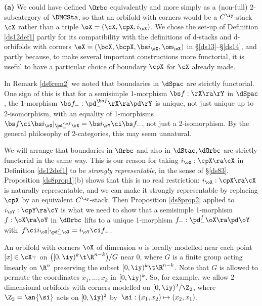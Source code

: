 \documentclass{article}
\begin{document}
\begin{rem}{\bf(a)} We could have defined $\Orbc$ equivalently and
more simply as a (non-full) 2-subcategory of $\DMCSta$, so that an
orbifold with corners would be a $C^\iy$-stack $\cX$ rather than a
triple $\oX=(\cX,\cpX,i_\oX)$. We chose the set-up of Definition
\ref{ds12def1} partly for its compatibility with the definitions of
d-stacks and d-orbifolds with corners $\eX=(\bcX,\bcpX,\bs
i_\eX,\om_\eX)$ in \S\ref{ds13}--\S\ref{ds14}, and partly because,
to make several important constructions more functorial, it is
useful to have a particular choice of boundary $\cpX$ for $\cX$
already made.
\smallskip

 In Remark \ref{ds6rem2} we noted that boundaries
in $\dSpac$ are strictly functorial. One sign of this is that for a
semisimple 1-morphism $\bs f:\rX\ra\rY$ in $\dSpac$, the 1-morphism
$\bs f_-:\pd_-^{\bs f}\rX\ra\pd\rY$ is unique, not just unique up to
2-isomorphism, with an equality of 1-morphisms $\bs f\ci\bs i_\rX
\vert_{\smash{\pd_-^{\bs f}\rX}}=\bs i_\rY\ci\bs f_-$, not just a
2-isomorphism. By the general philosophy of 2-categories, this may
seem unnatural.

We will arrange that boundaries in $\Orbc$ and also in
$\dStac,\dOrbc$ are strictly functorial in the same way. This is our
reason for taking $i_\oX:\cpX\ra\cX$ in Definition \ref{ds12def1} to
be {\it strongly representable},
 in the sense of \S\ref{ds83}.
Proposition \ref{ds8prop1}(b) shows that this is no real
restriction: $i_\oX:\cpX\ra\cX$ is naturally representable, and we
can make it strongly representable by replacing $\cpX$ by an
equivalent $C^\iy$-stack. Then Proposition \ref{ds8prop2} applied to
$i_\oY:\cpY\ra\cY$ is what we need to show that a semisimple
1-morphism $f:\oX\ra\oY$ in $\dOrbc$ lifts to a unique 1-morphism
$f_-:\pd_-^f\oX\ra\pd\oY$ with~$f\ci i_\oX
\vert_{\smash{\pd_-^f\oX}}=i_\oY\ci f_-$.
\smallskip

 An orbifold with corners $\oX$ of dimension $n$ is
locally modelled near each point $[x]\in\cX_\top$ on
$\bigl([0,\iy)^k\t\R^{n-k} \bigr)/G$ near $0$, where $G$ is a finite
group acting linearly on $\R^n$ preserving the subset
$[0,\iy)^k\t\R^{n-k}$. Note that $G$ is allowed to permute the
coordinates $x_1,\ldots,x_k$ in $[0,\iy)^k$. So, for example, we
allow 2-dimensional orbifolds with corners modelled on
$[0,\iy)^2/\Z_2$, where $\Z_2=\an{\si}$ acts on $[0,\iy)^2$
by~$\si:(x_1,x_2)\mapsto(x_2,x_1)$.


\end{rem}
\end{document}
